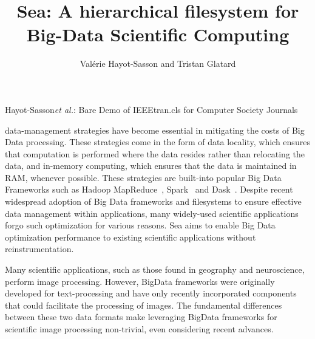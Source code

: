\documentclass[10pt,journal,compsoc]{IEEEtran}
\begin{document}
\title{Sea: A hierarchical filesystem for Big-Data Scientific Computing}

\author{Val\'erie Hayot-Sasson and Tristan Glatard}

%
{Hayot-Sasson\MakeLowercase{\textit{et al.}}: Bare Demo of IEEEtran.cls for Computer Society Journals}
\IEEEtitleabstractindextext{%
\begin{abstract}
\end{abstract}
}


\maketitle


\IEEEdisplaynontitleabstractindextext
\IEEEpeerreviewmaketitle



 data-management strategies have become essential in 
mitigating the costs of Big Data processing. These strategies come in the form
of data locality, which ensures that computation is performed where the data resides
rather than relocating the data, and in-memory computing, which ensures that the data is
maintained in RAM, whenever possible. These strategies are built-into popular Big Data Frameworks
such as Hadoop MapReduce~\cite{mapreduce}, Spark~\cite{spark} and Dask~\cite{dask}.
Despite recent widespread adoption of Big Data frameworks and filesystems to ensure effective data
management within applications, many widely-used scientific applications forgo such optimization for various reasons.
Sea aims to enable Big Data optimization performance to existing scientific applications without reinstrumentation.

Many scientific applications, such as those found in geography and neuroscience, perform
image processing. However,  BigData frameworks were originally developed
for text-processing and have only recently incorporated components that could facilitate
the processing of images. The fundamental differences between these two data formats make leveraging
BigData frameworks for
scientific image processing non-trivial, even considering recent advances. 
\end{document}
